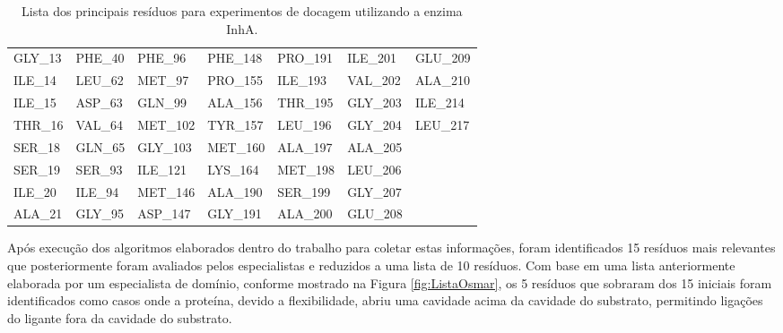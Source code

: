 \begin{table}[h]
\caption{Lista dos principais resíduos para experimentos de docagem utilizando a enzima InhA.}
\label{tab:listaOsmar}
\centering
\begin{tabular}{@{}lllllll@{}}
GLY\_13	&	PHE\_40 &	PHE\_96	&	PHE\_148 &	PRO\_191 &	ILE\_201 &	GLU\_209 		\\
ILE\_14	&	LEU\_62 &	MET\_97	&	PRO\_155 &	ILE\_193 &	VAL\_202 &	ALA\_210 		\\
ILE\_15	&	ASP\_63 &	GLN\_99	&	ALA\_156 &	THR\_195 &	GLY\_203 &	ILE\_214 		\\
THR\_16	&	VAL\_64 &	MET\_102 &	TYR\_157 &	LEU\_196 &	GLY\_204 &	LEU\_217 		\\
SER\_18	&	GLN\_65 &	GLY\_103 &	MET\_160 &	ALA\_197 &	ALA\_205 &					\\
SER\_19	&	SER\_93 &	ILE\_121 &	LYS\_164 &	MET\_198 &	LEU\_206 &					\\
ILE\_20	&	ILE\_94	&	MET\_146 &	ALA\_190 &	SER\_199 &	GLY\_207 &					\\
ALA\_21 &	GLY\_95	&	ASP\_147 &	GLY\_191 &	ALA\_200 &	GLU\_208 &					\\ 
\end{tabular}
\end{table}

Após execução dos algoritmos elaborados dentro do trabalho para coletar estas informações, foram identificados 15 resíduos mais relevantes que posteriormente foram avaliados pelos especialistas e reduzidos a uma lista de 10 resíduos. Com base em uma lista anteriormente elaborada por um especialista de domínio, conforme mostrado na Figura \ref{fig:ListaOsmar}, os 5 resíduos que sobraram dos 15 iniciais foram identificados como casos onde a proteína, devido a flexibilidade, abriu uma cavidade acima da cavidade do substrato, permitindo ligações do ligante fora da cavidade do substrato.

